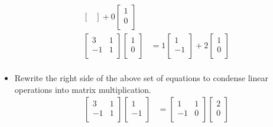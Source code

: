 \documentclass{article}
\begin{document}
\begin{itemize}
\begin{align*}
\begin{bmatrix}
        \end{bmatrix}
        +0
        \begin{bmatrix}
            1\\
            0\\
        \end{bmatrix}\\
        \begin{bmatrix}
            3 & 1\\
            -1 & 1\\
        \end{bmatrix}
        \begin{bmatrix}
            1\\
            0\\
        \end{bmatrix}
        &= 1
        \begin{bmatrix}
            1\\
            -1\\
        \end{bmatrix}
        +2
        \begin{bmatrix}
            1\\
            0\\
        \end{bmatrix}\\
    \end{align*}
    \item Rewrite the right side of the above set of equations to condense linear operations into matrix multiplication.
    \begin{align*}
        \begin{bmatrix}
            3 & 1\\
            -1 & 1\\
        \end{bmatrix}
        \begin{bmatrix}
            1\\
            -1\\
        \end{bmatrix}
        &=
        \begin{bmatrix}
            1 & 1\\
            -1 & 0\\
        \end{bmatrix}
        \begin{bmatrix}
            2\\
            0\\
        \end{bmatrix}\\

\end{align*}
\end{itemize}
\end{document}
